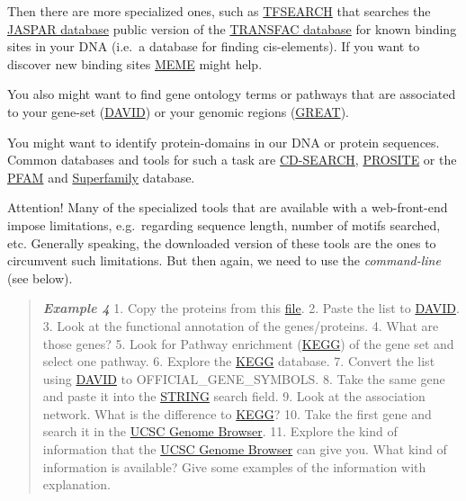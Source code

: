 \documentclass[]{article}
\begin{document}
Then there are more specialized ones, such as
\href{http://www.cbrc.jp/research/db/TFSEARCH.html}{TFSEARCH} that
searches the \href{http://jaspar.genereg.net/}{JASPAR database} public
version of the
\href{http://www.gene-regulation.com/pub/databases.html}{TRANSFAC
database} for known binding sites in your DNA (i.e.~a database for
finding cis-elements). If you want to discover new binding sites
\href{http://meme.nbcr.net/meme/}{MEME} might help.

You also might want to find gene ontology terms or pathways that are
associated to your gene-set
(\href{http://david.abcc.ncifcrf.gov/}{DAVID}) or your genomic regions
(\href{http://bejerano.stanford.edu/great/public/html/}{GREAT}).

You might want to identify protein-domains in our DNA or protein
sequences. Common databases and tools for such a task are
\href{http://www.ncbi.nlm.nih.gov/Structure/bwrpsb/bwrpsb.cgi?}{CD-SEARCH},
\href{http://prosite.expasy.org/}{PROSITE} or the
\href{http://pfam.xfam.org/}{PFAM} and
\href{http://supfam.org/SUPERFAMILY/hmm.html}{Superfamily} database.

Attention! Many of the specialized tools that are available with a
web-front-end impose limitations, e.g.~regarding sequence length, number
of motifs searched, etc. Generally speaking, the downloaded version of
these tools are the ones to circumvent such limitations. But then again,
we need to use the \emph{command-line} (see below).

\begin{quote}
\emph{\textbf{Example 4}} 1. Copy the proteins from this
\href{http://compbio.massey.ac.nz/wiki/data/c1/gene_set.txt}{file}. 2.
Paste the list to \href{http://david.abcc.ncifcrf.gov/}{DAVID}. 3. Look
at the functional annotation of the genes/proteins. 4. What are those
genes? 5. Look for Pathway enrichment
(\href{http://www.genome.jp/kegg/}{KEGG}) of the gene set and select one
pathway. 6. Explore the \href{http://www.genome.jp/kegg/}{KEGG}
database. 7. Convert the list using
\href{http://david.abcc.ncifcrf.gov/}{DAVID} to OFFICIAL\_GENE\_SYMBOLS.
8. Take the same gene and paste it into the
\href{http://string-db.org/}{STRING} search field. 9. Look at the
association network. What is the difference to
\href{http://www.genome.jp/kegg/}{KEGG}? 10. Take the first gene and
search it in the \href{http://genome.ucsc.edu/}{UCSC Genome Browser}.
11. Explore the kind of information that the
\href{http://genome.ucsc.edu/}{UCSC Genome Browser} can give you. What
kind of information is available? Give some examples of the information
with explanation.
\end{quote}
\end{document}
